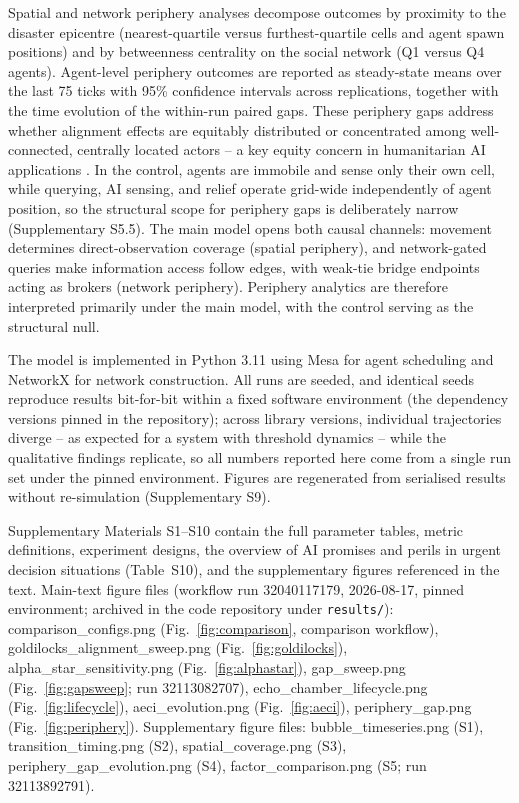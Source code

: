 \documentclass[pdflatex,sn-nature]{sn-jnl}
\begin{document}
Spatial and network periphery analyses decompose outcomes by proximity to the disaster epicentre (nearest-quartile versus furthest-quartile cells and agent spawn positions) and by betweenness centrality on the social network (Q1 versus Q4 agents). Agent-level periphery outcomes are reported as steady-state means over the last 75 ticks with 95\% confidence intervals across replications, together with the time evolution of the within-run paired gaps. These periphery gaps address whether alignment effects are equitably distributed or concentrated among well-connected, centrally located actors -- a key equity concern in humanitarian AI applications \citep{coleman2024weaving}. In the control, agents are immobile and sense only their own cell, while querying, AI sensing, and relief operate grid-wide independently of agent position, so the structural scope for periphery gaps is deliberately narrow (Supplementary S5.5). The main model opens both causal channels: movement determines direct-observation coverage (spatial periphery), and network-gated queries make information access follow edges, with weak-tie bridge endpoints acting as brokers (network periphery). Periphery analytics are therefore interpreted primarily under the main model, with the control serving as the structural null.

The model is implemented in Python 3.11 using Mesa for agent scheduling and NetworkX for network construction. All runs are seeded, and identical seeds reproduce results bit-for-bit within a fixed software environment (the dependency versions pinned in the repository); across library versions, individual trajectories diverge -- as expected for a system with threshold dynamics -- while the qualitative findings replicate, so all numbers reported here come from a single run set under the pinned environment. Figures are regenerated from serialised results without re-simulation (Supplementary S9).

\backmatter

Supplementary Materials S1--S10 contain the full parameter tables, metric definitions, experiment designs, the overview of AI promises and perils in urgent decision situations (Table~S10), and the supplementary figures referenced in the text. Main-text figure files (workflow run 32040117179, 2026-08-17, pinned environment; archived in the code repository under \texttt{results/}): comparison\_configs.png (Fig.~\ref{fig:comparison}, comparison workflow), goldilocks\_alignment\_sweep.png (Fig.~\ref{fig:goldilocks}), alpha\_star\_sensitivity.png (Fig.~\ref{fig:alphastar}), gap\_sweep.png (Fig.~\ref{fig:gapsweep}; run 32113082707), echo\_chamber\_lifecycle.png (Fig.~\ref{fig:lifecycle}), aeci\_evolution.png (Fig.~\ref{fig:aeci}), periphery\_gap.png (Fig.~\ref{fig:periphery}). Supplementary figure files: bubble\_timeseries.png (S1), transition\_timing.png (S2), spatial\_coverage.png (S3), periphery\_gap\_evolution.png (S4), factor\_comparison.png (S5; run 32113892791).
\end{document}
